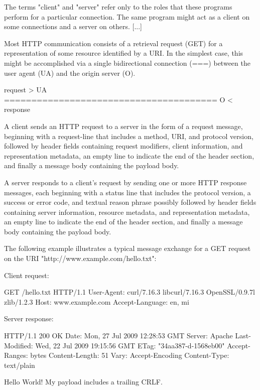\begin{termc} [basicstyle=\footnotesize\ttfamily, frame=singlelabel={lst-rfc7230}]
  The terms "client" and "server" refer only to the roles that these
  programs perform for a particular connection.  The same program might
  act as a client on some connections and a server on others. [...]
 
  Most HTTP communication consists of a retrieval request (GET) for a
  representation of some resource identified by a URI.  In the simplest
  case, this might be accomplished via a single bidirectional
  connection (===) between the user agent (UA) and the origin
  server (O).

           request   >
      UA ======================================= O
                                  <   response

  A client sends an HTTP request to a server in the form of a request
  message, beginning with a request-line that includes a method, URI,
  and protocol version, followed by header fields
  containing request modifiers, client information, and representation
  metadata, an empty line to indicate the end of the
  header section, and finally a message body containing the payload
  body.

  A server responds to a client's request by sending one or more HTTP
  response messages, each beginning with a status line that includes
  the protocol version, a success or error code, and textual reason
  phrase possibly followed by header fields containing
  server information, resource metadata, and representation metadata,
  an empty line to indicate the end of the header
  section, and finally a message body containing the payload body.

  The following example illustrates a typical message exchange for a
  GET request on the URI "http://www.example.com/hello.txt":

  Client request:

    GET /hello.txt HTTP/1.1
    User-Agent: curl/7.16.3 libcurl/7.16.3 OpenSSL/0.9.7l zlib/1.2.3
    Host: www.example.com
    Accept-Language: en, mi

  Server response:

    HTTP/1.1 200 OK
    Date: Mon, 27 Jul 2009 12:28:53 GMT
    Server: Apache
    Last-Modified: Wed, 22 Jul 2009 19:15:56 GMT
    ETag: "34aa387-d-1568eb00"
    Accept-Ranges: bytes
    Content-Length: 51
    Vary: Accept-Encoding
    Content-Type: text/plain

    Hello World! My payload includes a trailing CRLF.
\end{termc}

